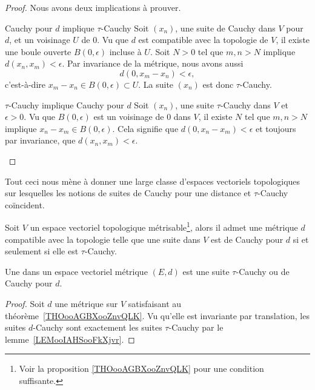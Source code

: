 \begin{proof}
    Nous avons deux implications à prouver. 
    \begin{subproof}
    \item[Cauchy pour \( d\) implique \( \tau\)-Cauchy]
        Soit \( (x_n)\), une suite de Cauchy dans \( V\) pour \( d\), et un voisinage \( U\) de \( 0\). Vu que \( d\) est compatible avec la topologie de \( V\), il existe une boule ouverte \( B(0,\epsilon)\) incluse à \( U\). Soit \( N>0\) tel que \( m,n>N\) implique \( d(x_n,x_m)<\epsilon\). Par invariance de la métrique, nous avons aussi
        \begin{equation}
            d(0,x_m-x_n)<\epsilon,
        \end{equation}
        c'est-à-dire \( x_m-x_n\in B(0,\epsilon)\subset U\). La suite \( (x_n)\) est donc \( \tau\)-Cauchy.
    \item[\( \tau\)-Cauchy implique Cauchy pour \( d\)]
        Soit $(x_n)$, une suite \( \tau\)-Cauchy dans \( V\) et \( \epsilon>0\). Vu que \( B(0,\epsilon)\) est un voisinage de \( 0\) dans \( V\), il existe \( N\) tel que \( m,n>N\) implique \( x_n-x_m\in B(0,\epsilon)\). Cela signifie que \( d(0,x_n-x_m)<\epsilon\) et toujours par invariance, que \( d(x_n,x_m)<\epsilon\).
    \end{subproof}
\end{proof}

Tout ceci nous mène à donner une large classe d'espaces vectoriels topologiques sur lesquelles les notions de suites de Cauchy pour une distance et \( \tau\)-Cauchy coïncident.

\begin{theoremDef}     \label{THOooGQZSooAmQolf}
    Soit \( V\) un espace vectoriel topologique métrisable\footnote{Voir la proposition \ref{THOooAGBXooZnvQLK} pour une condition suffisante.}, alors il admet une métrique \( d\) compatible avec la topologie telle que une suite dans \( V\) est de Cauchy pour \( d\) si et seulement si elle est \( \tau\)-Cauchy.

    Une  dans un espace vectoriel métrique \( (E,d)\) est une suite \( \tau\)-Cauchy ou de Cauchy pour \( d \).
\end{theoremDef}

\begin{proof}
    Soit \( d\) une métrique sur \( V\) satisfaisant au théorème~\ref{THOooAGBXooZnvQLK}. Vu qu'elle est invariante par translation, les suites \( d\)-Cauchy sont exactement les suites \( \tau\)-Cauchy par le lemme~\ref{LEMooIAHSooFkXjvr}.
\end{proof}

